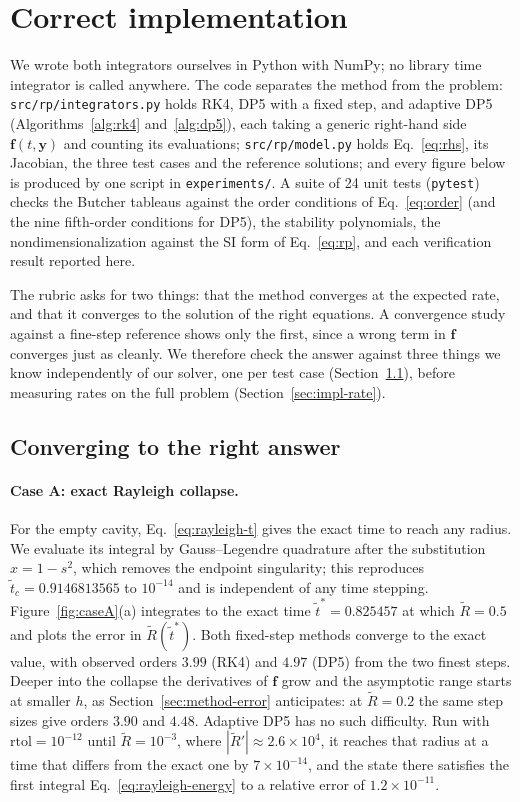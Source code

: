 \section{Correct implementation}\label{sec:implementation}

We wrote both integrators ourselves in Python with NumPy; no library time
integrator is called anywhere. The code separates the method from the problem:
\texttt{src/rp/integrators.py} holds RK4, DP5 with a fixed step, and adaptive
DP5 (Algorithms~\ref{alg:rk4} and~\ref{alg:dp5}), each taking a generic
right-hand side $\mathbf{f}(t,\mathbf{y})$ and counting its evaluations;
\texttt{src/rp/model.py} holds Eq.~\eqref{eq:rhs}, its Jacobian, the three test
cases and the reference solutions; and every figure below is produced by one
script in \texttt{experiments/}. A suite of 24 unit tests (\texttt{pytest})
checks the Butcher tableaus against the order conditions of
Eq.~\eqref{eq:order} (and the nine fifth-order conditions for DP5), the
stability polynomials, the nondimensionalization against the SI form of
Eq.~\eqref{eq:rp}, and each verification result reported here.

The rubric asks for two things: that the method converges at the expected rate,
and that it converges to the solution of the right equations. A convergence
study against a fine-step reference shows only the first, since a wrong term in
$\mathbf{f}$ converges just as cleanly. We therefore check the answer against
three things we know independently of our solver, one per test case
(Section~\ref{sec:impl-verify}), before measuring rates on the full problem
(Section~\ref{sec:impl-rate}).

\subsection{Converging to the right answer}\label{sec:impl-verify}

\paragraph{Case A: exact Rayleigh collapse.} For the empty cavity, Eq.~\eqref{eq:rayleigh-t}
gives the exact time to reach any radius. We evaluate its integral by
Gauss--Legendre quadrature after the substitution $x=1-s^2$, which removes the
endpoint singularity; this reproduces $\tilde t_c=0.9146813565$ to $10^{-14}$
and is independent of any time stepping. Figure~\ref{fig:caseA}(a) integrates
to the exact time $\tilde t^*=0.825457$ at which $\tilde R=0.5$ and plots the
error in $\tilde R(\tilde t^*)$. Both fixed-step methods converge to the exact
value, with observed orders $3.99$ (RK4) and $4.97$ (DP5) from the two finest
steps. Deeper into the collapse the derivatives of $\mathbf{f}$ grow and the
asymptotic range starts at smaller $h$, as Section~\ref{sec:method-error}
anticipates: at $\tilde R=0.2$ the same step sizes give orders $3.90$ and $4.48$.
Adaptive DP5 has no such difficulty. Run with $\mathrm{rtol}=10^{-12}$ until
$\tilde R=10^{-3}$, where $|\tilde R'|\approx2.6\times10^{4}$, it reaches that
radius at a time that differs from the exact one by $7\times10^{-14}$, and the
state there satisfies the first integral Eq.~\eqref{eq:rayleigh-energy} to a
relative error of $1.2\times10^{-11}$.

